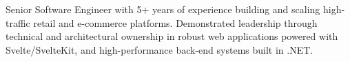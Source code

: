 Senior Software Engineer with 5+ years of experience building and scaling high-traffic retail and e-commerce platforms. Demonstrated leadership through technical and architectural ownership in robust web applications powered with Svelte/SvelteKit, and high-performance back-end systems built in .NET.
